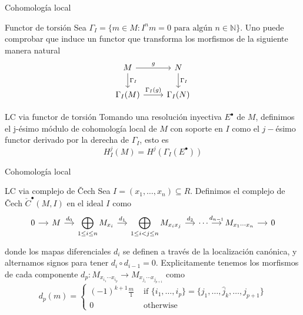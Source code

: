 \documentclass{beamer}
\begin{document}
\begin{frame}[fragile]{Cohomología local}
  \begin{block}{Functor de torsión}
Sea $\Gamma_I= \{m\in M : I^nm = 0 \text{ para algún }n\in \mathbb{N} \}$. Uno puede comprobar que induce un functor que transforma los morfismos de la siguiente manera natural
\[\begin{tikzcd}
	M & N \\
	{\Gamma_I(M)} & {\Gamma_I(N)}
	\arrow["{\Gamma_I}", from=1-1, to=2-1]
	\arrow["{\Gamma_I}", from=1-2, to=2-2]
	\arrow["g", from=1-1, to=1-2]
	\arrow["{\Gamma_I(g)}", from=2-1, to=2-2]
\end{tikzcd}\]
  \end{block}
  \begin{block}{LC via functor de torsión}
Tomando una resolución inyectiva $E^\bullet$ de $M$, definimos el j-ésimo módulo de cohomología local de $M$ con soporte en  $I$ como el  $j-$ésimo functor derivado por la derecha de $\Gamma_I $, esto es
\[
H_I^j(M)=H^j(\Gamma _I (E^\bullet) )
\] 
\end{block}
\end{frame}


\begin{frame}[fragile]{Cohomología local}
  \begin{block}{LC via complejo de \v{C}ech}
Sea $I=(x_1, \ldots, x_n)\subseteq R$. Definimos el complejo de \v{C}ech $\check{C}^{\bullet}(M, I)$ en el ideal $I$ como
\[\begin{tikzcd}[column sep=small]
	0 & M & {\displaystyle{\bigoplus_{1\le i\le n} M_{x_i}}} & {\displaystyle{\bigoplus_{1\le i<j\le n} M_{x_ix_j}}} & \cdots & {M_{x_1\cdots x_n}} & 0
	\arrow[from=1-1, to=1-2]
	\arrow["{d_0}", from=1-2, to=1-3]
	\arrow["{d_1}", from=1-3, to=1-4]
	\arrow["{d_2}", from=1-4, to=1-5]
	\arrow["{d_{n-1}}", from=1-5, to=1-6]
	\arrow[from=1-6, to=1-7]
\end{tikzcd}\]
donde los mapas diferenciales $d_i$ se definen a través de la localización canónica, y alternamos signos para tener  $d_i\circ d_{i-1}=0$. Explicitamente tenemos los morfismos de cada componente
$d_p: M_{x_{i_1}\cdots x_{i_p}} \to M_{x_{j_1}\cdots x_{j_{p+1}}}$ como 
\[
  d_p(m) = \begin{cases}
	(-1)^{k+1} \frac{m}{1} &\text{ if } \{i_1, \ldots, i_p\} = \{j_1, \ldots, \hat{j}_k,\ldots, j_{p+1}\}\\ 0 &\text{ otherwise}
  \end{cases}
\] 
\end{block}
\end{frame}
\end{document}
